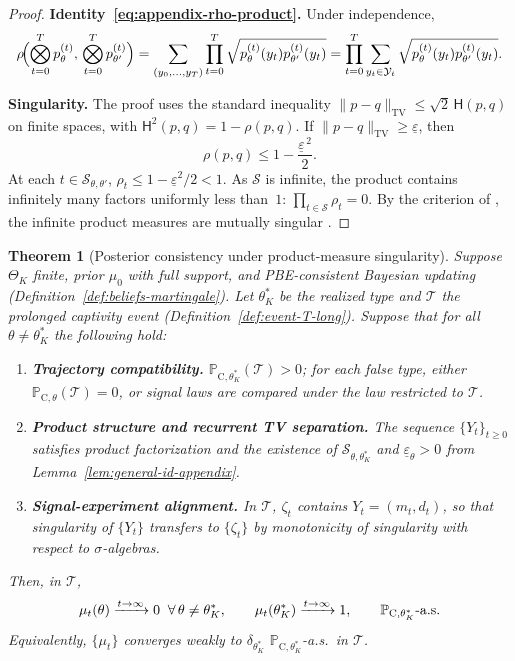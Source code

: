 \documentclass[12pt]{article}
\numberwithin{equation}{section}
\numberwithin{table}{section}
\newtheorem{theorem}{Theorem}[section]
\theoremstyle{definition}
\newcommand{\ProbC}[1]{\mathbb{P}_{\mathrm{C},#1}}
\begin{document}
\begin{proof}
\textbf{Identity~\eqref{eq:appendix-rho-product}.}
Under independence,
\[
\rho\!\Bigl(\bigotimes_{t=0}^{T}p_\theta^{(t)},\,
            \bigotimes_{t=0}^{T}p_{\theta'}^{(t)}\Bigr)
=\sum_{(y_0,\ldots,y_T)}\prod_{t=0}^{T}\sqrt{p_\theta^{(t)}(y_t)p_{\theta'}^{(t)}(y_t)}
=\prod_{t=0}^{T}\sum_{y_t\in\mathcal{Y}_t}
  \sqrt{p_\theta^{(t)}(y_t)p_{\theta'}^{(t)}(y_t)}.
\]

\noindent\textbf{Singularity.}
The proof uses the standard inequality
$\|p-q\|_{\mathrm{TV}}\le\sqrt{2}\,\mathsf{H}(p,q)$
on finite spaces, with $\mathsf{H}^2(p,q)=1-\rho(p,q)$. If
$\|p-q\|_{\mathrm{TV}}\ge\underline\varepsilon$, then
\[
\rho(p,q)\le 1-\frac{\underline\varepsilon^{\,2}}{2}.
\]
At each $t\in\mathcal{S}_{\theta,\theta'}$,
$\rho_t\le 1-\underline\varepsilon^2/2<1$. As $\mathcal{S}$ is infinite, the
product contains infinitely many factors uniformly less than~$1$:
$\prod_{t\in\mathcal{S}}\rho_t=0$. By the criterion of \citet{Kakutani1948},
the infinite product measures are mutually singular
\citep{Shiryaev2019Probability}.
\end{proof}

\bigskip

\begin{theorem}[Posterior consistency under product-measure singularity]
\label{thm:posterior-consistency-appendix}
Suppose $\Theta_K$ finite, prior $\mu_0$ with full support, and PBE-consistent
Bayesian updating (Definition~\ref{def:beliefs-martingale}).
Let $\theta_K^\ast$ be the realized type and $\mathcal{T}$ the prolonged
captivity event (Definition~\ref{def:event-T-long}). Suppose that for all
$\theta\neq\theta_K^\ast$ the following hold:
\begin{enumerate}
  \item[\textup{(i)}] \textbf{Trajectory compatibility.}
  $\ProbC{\theta_K^\ast}(\mathcal{T})>0$; for each false type, either
  $\ProbC{\theta}(\mathcal{T})=0$, or signal laws are compared under the law
  restricted to $\mathcal{T}$.
  \item[\textup{(ii)}] \textbf{Product structure and recurrent TV separation.}
  The sequence $\{Y_t\}_{t\ge 0}$ satisfies product factorization and the
  existence of $\mathcal{S}_{\theta,\theta_K^\ast}$ and
  $\underline\varepsilon_\theta>0$ from Lemma~\ref{lem:general-id-appendix}.
  \item[\textup{(iii)}] \textbf{Signal-experiment alignment.}
  In $\mathcal{T}$, $\zeta_t$ contains $Y_t=(m_t,d_t)$, so that singularity of
  $\{Y_t\}$ transfers to $\{\zeta_t\}$ by monotonicity of singularity with
  respect to $\sigma$-algebras.
\end{enumerate}
Then, in $\mathcal{T}$,
\[
\mu_t(\theta)\xrightarrow{t\to\infty}0\;\;\forall\,\theta\neq\theta_K^\ast,
\qquad
\mu_t(\theta_K^\ast)\xrightarrow{t\to\infty}1,
\qquad\ProbC{\theta_K^\ast}\textup{-a.s.}
\]
Equivalently, $\{\mu_t\}$ converges weakly to $\delta_{\theta_K^\ast}$
$\ProbC{\theta_K^\ast}$-a.s.\ in $\mathcal{T}$.
\end{theorem}
\end{document}

